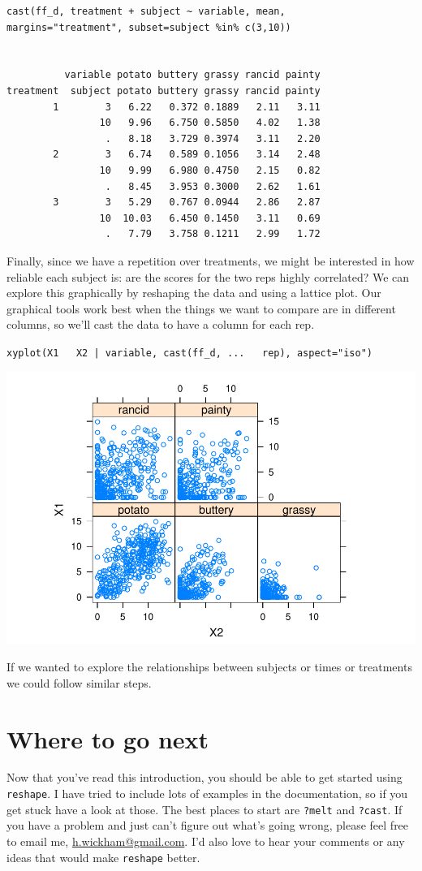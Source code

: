 \documentclass[]{article}
\begin{document}
\begin{verbatim}
cast(ff_d, treatment + subject ~ variable, mean, 
margins="treatment", subset=subject %in% c(3,10))

                                                      
          variable potato buttery grassy rancid painty
treatment  subject potato buttery grassy rancid painty
        1        3   6.22   0.372 0.1889   2.11   3.11
                10   9.96   6.750 0.5850   4.02   1.38
                 .   8.18   3.729 0.3974   3.11   2.20
        2        3   6.74   0.589 0.1056   3.14   2.48
                10   9.99   6.980 0.4750   2.15   0.82
                 .   8.45   3.953 0.3000   2.62   1.61
        3        3   5.29   0.767 0.0944   2.86   2.87
                10  10.03   6.450 0.1450   3.11   0.69
                 .   7.79   3.758 0.1211   2.99   1.72
\end{verbatim}

Finally, since we have a repetition over treatments, we might be interested in how reliable each subject is: are the scores for the two reps highly correlated?  We can explore this graphically by reshaping the data and using a lattice plot.  Our graphical tools work best when the things we want to compare are in different columns, so we'll cast the data to have a column for each rep.

\texttt{xyplot(X1 ~ X2 | variable, cast(ff\_d, ... ~ rep), aspect="iso")}

\includegraphics{.introductionw.wcache/1doja.pdf}

If we wanted to explore the relationships between subjects or times or treatments we could follow similar steps.

\section{Where to go next}

Now that you've read this introduction, you should be able to get started using \texttt{reshape}.  I have tried to include lots of examples in the documentation, so if you get stuck have a look at those.  The best places to start are \texttt{?melt} and \texttt{?cast}.  If you have a problem and just can't figure out what's going wrong, please feel free to email me, \href{mailto:h.wickham@gmail.com}{h.wickham@gmail.com}.  I'd also love to hear your comments or any ideas that would make \texttt{reshape} better.
\end{document}
